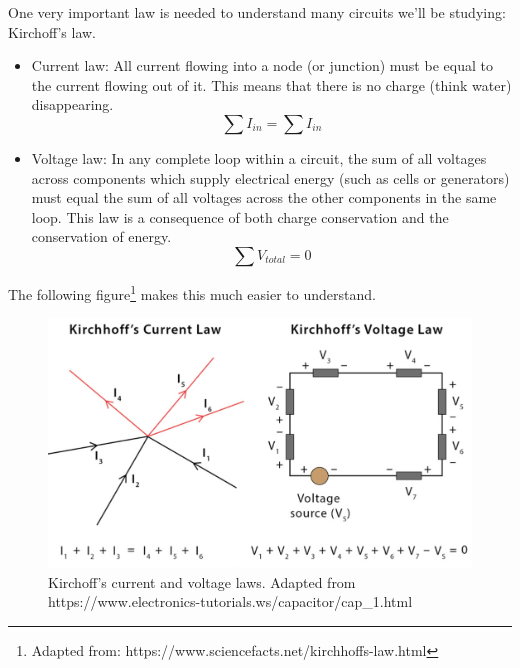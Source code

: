 One very important law is needed to understand many circuits we'll be studying: Kirchoff's law. 

\begin{itemize}
    \item Current law: All current flowing into a node (or junction) must be equal to the current flowing out of it. This means that there is no charge (think water) disappearing.
    \begin{equation}
        \sum I_{in} = \sum I_{in}
    \end{equation}
    \item Voltage law: In any complete loop within a circuit, the sum of all voltages across components which supply electrical energy (such as cells or generators) must equal the sum of all voltages across the other components in the same loop. This law is a consequence of both charge conservation and the conservation of energy.
    \begin{equation}
        \sum V_{total} = 0
    \end{equation}
\end{itemize}

The following figure\footnote{Adapted from: https://www.sciencefacts.net/kirchhoffs-law.html} makes this much easier to understand.  

\begin{figure}[H]
    \centering
    \includegraphics[width=0.6\linewidth]{../../Figures/Kirchoff.PNG}
    \caption{Kirchoff's current and voltage laws. Adapted from https://www.electronics-tutorials.ws/capacitor/cap_1.html}
    \label{fig:Capacitors}
\end{figure}




